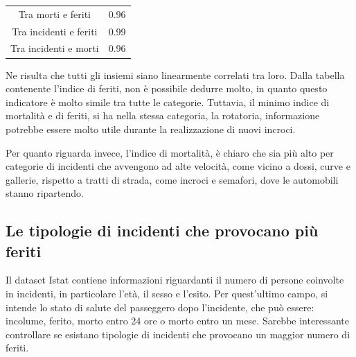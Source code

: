 \documentclass[a4paper,12pt]{report}
\begin{document}
\begin{center}
    \def\arraystretch{1.5}%
    \begin{tabular}{ |c|c| }
        \hline
        \rowcolor{TableGray}
        Tra morti e feriti      & 0.96 \\ 
        Tra incidenti e feriti  & 0.99 \\
        \rowcolor{TableGray}
        Tra incidenti e morti   & 0.96 \\
        \hline
    \end{tabular}
\end{center}

Ne risulta che tutti gli insiemi siano linearmente correlati tra loro. 
Dalla tabella contenente l'indice di feriti, non è possibile dedurre molto, 
in quanto questo indicatore è molto simile tra tutte le categorie. 
Tuttavia, il minimo indice di mortalità e di feriti, si ha nella stessa categoria, 
la rotatoria, informazione potrebbe essere molto utile durante la realizzazione di nuovi 
incroci.

Per quanto riguarda invece, l'indice di mortalità, è chiaro che sia più alto 
per categorie di incidenti che avvengono ad alte velocità, come vicino a dossi, 
curve e gallerie, rispetto a tratti di strada, come incroci e semafori, 
dove le automobili stanno ripartendo.

\subsection{Le tipologie di incidenti che provocano più feriti}

Il dataset Istat contiene informazioni riguardanti il numero di persone coinvolte 
in incidenti, in particolare l'età, il sesso e l'esito. 
Per quest'ultimo campo, si intende lo stato di salute del passeggero 
dopo l'incidente, che può essere: incolume, ferito, morto entro 24 ore o morto entro un mese.
Sarebbe interessante controllare se esistano tipologie di incidenti che provocano 
un maggior numero di feriti.
\end{document}
